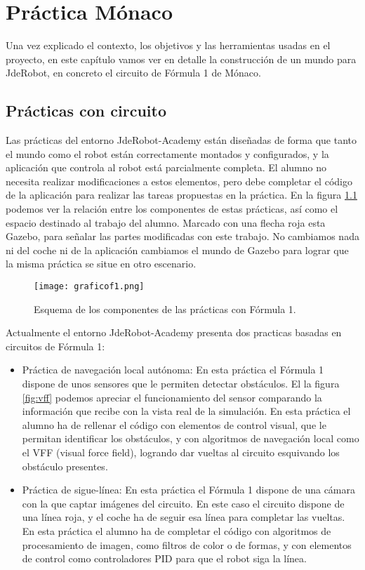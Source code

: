 \chapter{Práctica Mónaco}
\label{ch:PracticaMonaco}

Una vez explicado el contexto, los objetivos y las herramientas usadas en el proyecto, en este capítulo vamos ver en detalle la construcción de un mundo para JdeRobot, en concreto el circuito de Fórmula 1 de Mónaco.

\section{Prácticas con circuito}
\label{sec:pm_practicas}

Las prácticas del entorno JdeRobot-Academy están diseñadas de forma que tanto el mundo como el robot están correctamente montados y configurados, y la aplicación que controla al robot está parcialmente completa. El alumno no necesita realizar modificaciones a estos elementos, pero debe completar el código de la aplicación para realizar las tareas propuestas en la práctica. En la figura \ref{fig:graficof1} podemos ver la relación entre los componentes de estas prácticas, así como el espacio destinado al trabajo del alumno. Marcado con una flecha roja esta Gazebo, para señalar las partes modificadas con este trabajo. No cambiamos nada ni del coche ni de la aplicación cambiamos el mundo de Gazebo para lograr que la misma práctica se situe en otro escenario.

\begin{figure}[h]
	\centering
	\texttt{[image: graficof1.png]}
	\caption{Esquema de los componentes de las prácticas con Fórmula 1.} \label{fig:graficof1}
\end{figure}

Actualmente el entorno JdeRobot-Academy presenta dos practicas basadas en circuitos de Fórmula 1:
\begin{itemize}
	\item Práctica de navegación local autónoma: En esta práctica el Fórmula 1 dispone de unos sensores que le permiten detectar obstáculos. El la figura \ref{fig:vff} podemos apreciar el funcionamiento del sensor comparando la información que recibe con la vista real de la simulación. En esta práctica el alumno ha de rellenar el código con elementos de control visual, que le permitan identificar los obstáculos, y con algoritmos de navegación local como el VFF (visual force field), logrando dar vueltas al circuito esquivando los obstáculo presentes.
	
	\item Práctica de sigue-línea: En esta práctica el Fórmula 1 dispone de una cámara con la que captar imágenes del circuito. En este caso el circuito dispone de una línea roja, y el coche ha de seguir esa línea para completar las vueltas. En esta práctica el alumno ha de completar el código con algoritmos de procesamiento de imagen, como filtros de color o de formas, y con elementos de control como controladores PID para que el robot siga la línea.
\end{itemize}
	
